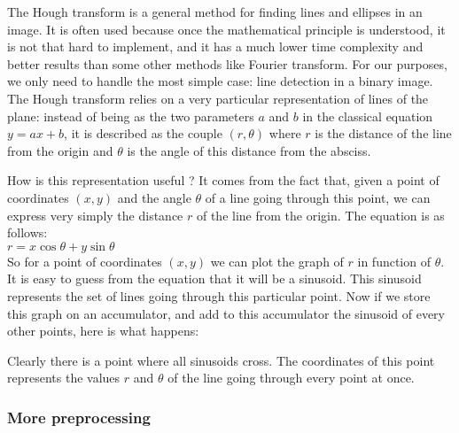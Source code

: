 \documentclass[12pt]{report}
\begin{document}
The Hough transform is a general method for finding lines and ellipses in an
image. It is often used because once the mathematical principle is understood,
it is not that hard to implement, and it has a much lower time complexity and
better results than some other methods like Fourier transform. For our purposes,
we only need to handle the most simple case: line detection in a binary image.\\

The Hough transform relies on a very particular representation of lines of the
plane: instead of being as the two parameters $a$ and $b$ in the classical
equation $y = ax + b$, it is described as the couple $(r, \theta)$ where $r$ is
the distance of the line from the origin and $\theta$ is the angle of this
distance from the absciss.\\

\begin{center}
\end{center}

How is this representation useful ? It comes from the fact that, given a point
of coordinates $(x, y)$ and the angle $\theta$ of a line going through this
point, we can express very simply the distance $r$ of the line from the origin.
The equation is as follows:\\

$r = x\cos\theta + y\sin\theta$\\

So for a point of coordinates $(x, y)$ we can plot the graph of $r$ in function
of $\theta$. It is easy to guess from the equation that it will be a sinusoid.
This sinusoid represents the set of lines going through this particular point.
Now if we store this graph on an accumulator, and add to this accumulator the
sinusoid of every other points, here is what happens:\\

\begin{center}
\end{center}

Clearly there is a point where all sinusoids cross. The coordinates of this
point represents the values $r$ and $\theta$ of the line going through every
point at once.

\subsubsection{More preprocessing}
\end{document}
